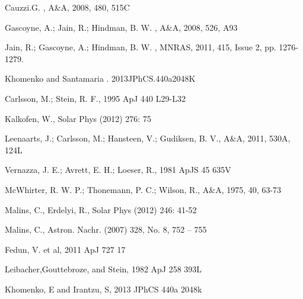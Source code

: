 \documentclass{aa}
\begin{document}
\begin{thebibliography}{}
Cauzzi.G. , A\&A, 2008, 480, 515C

Gascoyne, A.; Jain, R.; Hindman, B. W. , A\&A, 2008, 526, A93

Jain, R.; Gascoyne, A.; Hindman, B. W. , MNRAS, 2011, 415, Issue 2, pp. 1276-1279.

Khomenko and Santamaria . 2013JPhCS.440a2048K

 Carlsson, M.; Stein, R. F., 1995 ApJ 440 L29-L32

 Kalkofen, W., Solar Phys (2012) 276: 75

 Leenaarts, J.; Carlsson, M.; Hansteen, V.; Gudiksen, B. V., A\&A, 2011, 530A, 124L

 Vernazza, J. E.; Avrett, E. H.; Loeser, R., 1981 ApJS 45 635V

 McWhirter, R. W. P.; Thonemann, P. C.; Wilson, R., A\&A, 1975, 40, 63-73

 Malins, C., Erdelyi, R., Solar Phys (2012) 246: 41-52

 Malins, C.,  Astron. Nachr. (2007) 328, No. 8, 752 – 755

 Fedun, V. et al, 2011 ApJ 727 17

Leibacher,Gouttebroze, and Stein, 1982 ApJ 258 393L

Khomenko, E and Irantzu, S, 2013 JPhCS 440a 2048k



\end{thebibliography}
\end{document}
